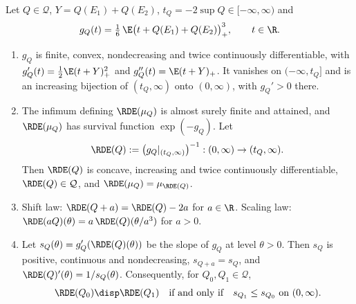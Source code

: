 \begin{lemma}\label{lem:existence-map}
Let $Q\in\mathcal{Q}$, $Y=Q(E_1)+Q(E_2)$, $t_Q=-2\sup Q\in[-\infty,\infty)$ and
\begin{equation}\label{eq:existence-g}
  g_Q(t)=\tfrac16\,\E\bigl(t+Q(E_1)+Q(E_2)\bigr)_+^3,\qquad t\in\R .
\end{equation}
\begin{enumerate}
\item[(i)] $g_Q$ is finite, convex, nondecreasing and twice continuously differentiable, with
$g_Q'(t)=\tfrac12\E(t+Y)_+^2$ and $g_Q''(t)=\E(t+Y)_+$. It vanishes on $(-\infty,t_Q]$ and is
an increasing bijection of $(t_Q,\infty)$ onto $(0,\infty)$, with $g_Q'>0$ there.
\item[(ii)] The infimum defining $\RDE(\mu_Q)$ is almost surely finite and attained, and
$\RDE(\mu_Q)$ has survival function $\exp(-g_Q)$. Let
\[
  \RDE(Q):=\bigl(g_Q|_{(t_Q,\infty)}\bigr)^{-1}:(0,\infty)\to(t_Q,\infty).
\]
Then $\RDE(Q)$ is concave, increasing and twice continuously differentiable,
$\RDE(Q)\in\mathcal{Q}$, and $\RDE(\mu_Q)=\mu_{\RDE(Q)}$.
\item[(iii)] Shift law: $\RDE(Q+a)=\RDE(Q)-2a$ for $a\in\R$. Scaling law:
$\RDE(aQ)(\theta)=a\,\RDE(Q)(\theta/a^3)$ for $a>0$.
\item[(iv)] Let $s_Q(\theta)=g_Q'(\RDE(Q)(\theta))$ be the slope of $g_Q$ at level
$\theta>0$. Then $s_Q$ is positive, continuous and nondecreasing, $s_{Q+a}=s_Q$, and
$\RDE(Q)'(\theta)=1/s_Q(\theta)$. Consequently, for $Q_0,Q_1\in\mathcal{Q}$,
\[
  \RDE(Q_0)\disp\RDE(Q_1)\quad\text{if and only if}\quad s_{Q_1}\le s_{Q_0}\text{ on }(0,\infty).
\]
\end{enumerate}
\end{lemma}

